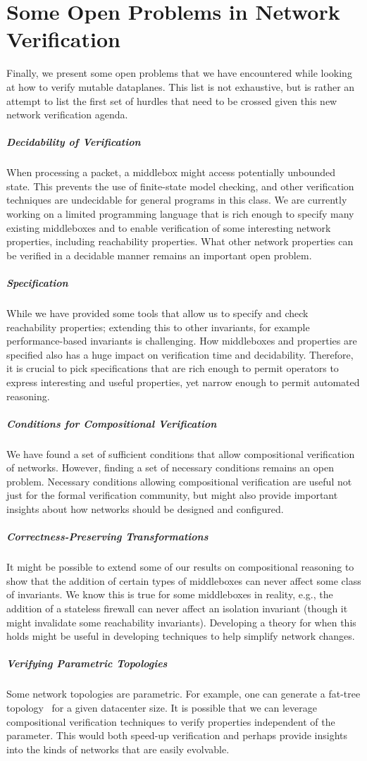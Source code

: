 \section{Some Open Problems in Network Verification}
Finally, we present some open problems that we have encountered while looking at how to verify mutable dataplanes. This list is not 
exhaustive, but is rather an attempt to list the first set of hurdles that need to be crossed given this new network verification agenda.

\subparagraph*{Decidability of Verification} When processing a packet, a middlebox might access potentially unbounded state. This prevents the use
of finite-state model checking, and other verification techniques are undecidable for general programs in this class. We are
currently working on a limited programming language that is rich enough to specify many existing middleboxes and to enable verification of some interesting network properties, including reachability properties. What other network properties can be verified in a decidable manner remains an important open problem.

\subparagraph*{Specification} While we have provided some tools
that allow us to specify and check reachability properties; extending this to other invariants, for example performance-based
invariants is challenging. How middleboxes and properties are specified also has a huge impact on verification time and
decidability. Therefore, it is crucial to pick specifications that are rich enough to permit operators to express interesting and
useful properties, yet narrow enough to permit automated reasoning.

\cbstart
\subparagraph*{Conditions for Compositional Verification} We have found a set of sufficient conditions that allow compositional verification of networks. However,
finding a set of necessary conditions remains an open problem. Necessary conditions allowing compositional verification are useful not just for the formal verification community, but might also provide important insights about how networks should be designed and configured.
\cbend

\subparagraph*{Correctness-Preserving Transformations} It might be possible to extend some of our results on compositional reasoning to show that the addition of certain types of middleboxes
can never affect some class of invariants. We know this is true for some middleboxes in reality, e.g., the addition of a stateless firewall
can never affect an isolation invariant (though it might invalidate some reachability invariants). Developing a theory for when this 
holds might be useful in developing techniques to help simplify network changes. 

\subparagraph*{Verifying Parametric Topologies} Some network topologies are parametric. For example, one can generate a fat-tree topology~\cite{al2008scalable} for a given datacenter size. It is possible that we can leverage compositional verification techniques to verify properties independent of the parameter. This would both speed-up verification and perhaps provide insights into the kinds of networks that are easily evolvable.